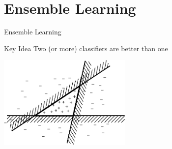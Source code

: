 \documentclass[14pt]{beamer}
\begin{document}
\section{Ensemble Learning}
\begin{frame}{Ensemble Learning}
	\begin{block}{Key Idea}
		Two (or more) classifiers are better than one
	\end{block}
	\begin{center}
		\includegraphics[height=1.8in]{ensemble-expressiveness}
	\end{center}
\end{frame}
\end{document}
